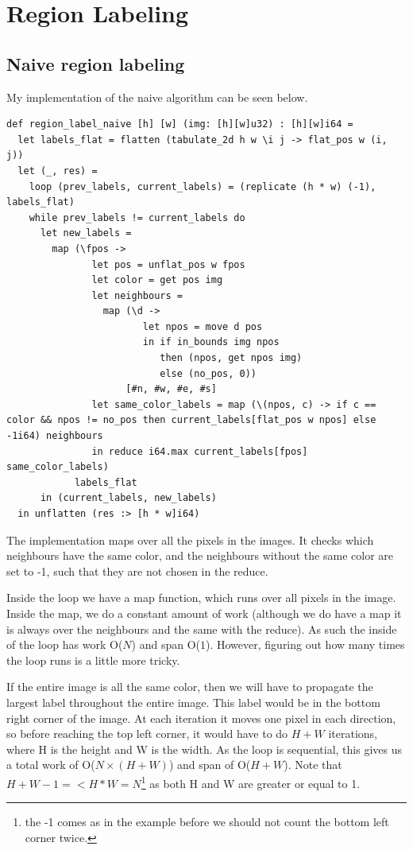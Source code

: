 \section{Region Labeling}
\subsection{Naive region labeling}
My implementation of the naive algorithm can be seen below.
\begin{lstlisting}[language={futhark}]
def region_label_naive [h] [w] (img: [h][w]u32) : [h][w]i64 =
  let labels_flat = flatten (tabulate_2d h w \i j -> flat_pos w (i, j))
  let (_, res) =
    loop (prev_labels, current_labels) = (replicate (h * w) (-1), labels_flat)
    while prev_labels != current_labels do
      let new_labels =
        map (\fpos ->
               let pos = unflat_pos w fpos
               let color = get pos img
               let neighbours =
                 map (\d ->
                        let npos = move d pos
                        in if in_bounds img npos
                           then (npos, get npos img)
                           else (no_pos, 0))
                     [#n, #w, #e, #s]
               let same_color_labels = map (\(npos, c) -> if c == color && npos != no_pos then current_labels[flat_pos w npos] else -1i64) neighbours
               in reduce i64.max current_labels[fpos] same_color_labels)
            labels_flat
      in (current_labels, new_labels)
  in unflatten (res :> [h * w]i64)
\end{lstlisting}

The implementation maps over all the pixels in the images. It checks which
neighbours have the same color, and the neighbours without the same color are
set to -1, such that they are not chosen in the reduce.

Inside the loop we have a map function, which runs over all pixels in the
image. Inside the map, we do a constant amount of work (although we do have a
map it is always over the neighbours and the same with the reduce). As such the
inside of the loop has work O($N$) and span O($1$). However, figuring out how
many times the loop runs is a little more tricky. 

If the entire image is all the same color, then we will have to propagate the
largest label throughout the entire image. This label would be in the bottom
right corner of the image. At each iteration it moves one pixel in each
direction, so before reaching the top left corner, it would have to do $H + W$
iterations, where H is the height and W is the width. As the loop is
sequential, this gives us a total work of O($N \times (H + W)$) and span of
O($H + W$). Note that $H + W - 1 =< H * W = N$\footnote{the -1 comes as in the
example before we should not count the bottom left corner twice.} as both H and
W are greater or equal to 1.

